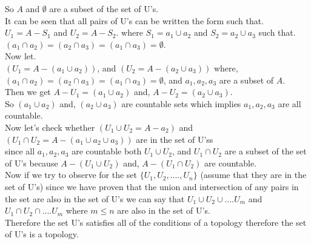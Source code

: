 \documentclass[11pt]{article}
\begin{document}
So $A$ and $\emptyset$ are a subset of the set of U's.\\

It can be seen that all pairs of U's can be written the form such that.\\

$U_1 = A - S_1$ and $U_2 = A - S_2$. where $S_1 = a_1 \cup a_2$ and $S_2 = a_2 \cup a_3$ such that.\\

$(a_1 \cap a_2) = (a_2 \cap a_3) = (a_1 \cap a_3) = \emptyset$.\\

Now let.\\

$(U_1 = A - (a_1 \cup a_2))$, and $(U_2 = A - (a_2 \cup a_3))$ where,\\

$(a_1 \cap a_2) = (a_2 \cap a_3) = (a_1 \cap a_3) = \emptyset$, and $a_1, a_2, a_3$ are a subset of $A$.\\

Then we get $A - U_1 = (a_1\cup a_2)$ and, $A-U_2 = (a_2 \cup a_3)$.\\

So $(a_1 \cup a_2)$ and, $(a_2 \cup a_3)$ are countable sets which implies $a_1, a_2, a_3$ are all countable.\\

Now let's check whether $(U_1 \cup U_2 = A - a_2)$ and $(U_1 \cap U_2 = A - (a_1 \cup a_2 \cup a_3))$ are in the set of U'ss\\

since all $a_1, a_2, a_3$ are countable both $U_1 \cup U_2$, and $U_1 \cap U_2$ are a subset of the set of U's because $A - (U_1 \cup U_2)$ and, $A - (U_1 \cap U_2)$ are countable.\\

Now if we try to observe for the set $\{U_1, U_2, ...., U_n\}$ (assume that they are in the set of U's) since we have proven that the union and intersection of any pairs in the set are also in the set of U's we can say that $U_1 \cup U_2 \cup .... U_m$ and $U_1 \cap U_2 \cap .... U_m$ where $m \le n$ are also in the set of U's.\\

Therefore the set U's satisfies all of the conditions of a topology therefore the set of U's is a topology.\\\\\\\\\\\\\\\\
\end{document}
